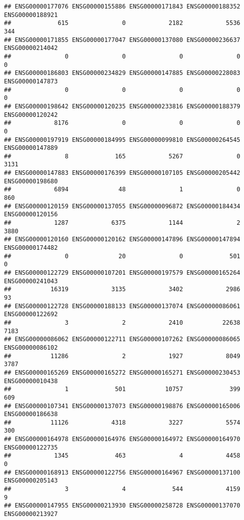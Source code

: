 \documentclass[
]{article}
\begin{document}
\begin{verbatim}
## ENSG00000177076 ENSG00000155886 ENSG00000171843 ENSG00000188352 ENSG00000188921 
##             615               0            2182            5536             344 
## ENSG00000171855 ENSG00000177047 ENSG00000137080 ENSG00000236637 ENSG00000214042 
##               0               0               0               0               0 
## ENSG00000186803 ENSG00000234829 ENSG00000147885 ENSG00000228083 ENSG00000147873 
##               0               0               0               0               0 
## ENSG00000198642 ENSG00000120235 ENSG00000233816 ENSG00000188379 ENSG00000120242 
##            8176               0               0               0               0 
## ENSG00000197919 ENSG00000184995 ENSG00000099810 ENSG00000264545 ENSG00000147889 
##               8             165            5267               0            3131 
## ENSG00000147883 ENSG00000176399 ENSG00000107105 ENSG00000205442 ENSG00000198680 
##            6894              48               1               0             860 
## ENSG00000120159 ENSG00000137055 ENSG00000096872 ENSG00000184434 ENSG00000120156 
##            1287            6375            1144               2            3880 
## ENSG00000120160 ENSG00000120162 ENSG00000147896 ENSG00000147894 ENSG00000174482 
##               0              20               0             501               0 
## ENSG00000122729 ENSG00000107201 ENSG00000197579 ENSG00000165264 ENSG00000241043 
##           16319            3135            3402            2986              93 
## ENSG00000122728 ENSG00000188133 ENSG00000137074 ENSG00000086061 ENSG00000122692 
##               3               2            2410           22638            7183 
## ENSG00000086062 ENSG00000122711 ENSG00000107262 ENSG00000086065 ENSG00000086102 
##           11286               2            1927            8049            3787 
## ENSG00000165269 ENSG00000165272 ENSG00000165271 ENSG00000230453 ENSG00000010438 
##               1             501           10757             399             609 
## ENSG00000107341 ENSG00000137073 ENSG00000198876 ENSG00000165006 ENSG00000186638 
##           11126            4318            3227            5574             300 
## ENSG00000164978 ENSG00000164976 ENSG00000164972 ENSG00000164970 ENSG00000122735 
##            1345             463               4            4458               0 
## ENSG00000168913 ENSG00000122756 ENSG00000164967 ENSG00000137100 ENSG00000205143 
##               3               4             544            4159               9 
## ENSG00000147955 ENSG00000213930 ENSG00000258728 ENSG00000137070 ENSG00000213927 

\end{verbatim}
\end{document}
